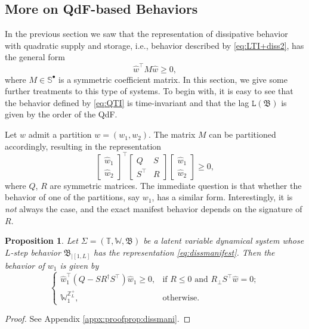\documentclass[11pt,print,draftcls,onecolumn,romanappendices]{ieeecolor}
\newtheorem{prop}[thm]{Proposition}
\newcommand{\W}{\mathbb{W}}
\newcommand{\T}{\mathbb{T}}
\newcommand{\Zp}[1]{\mathbb{Z}^+_{#1}}
\newcommand{\lag}[1]{\mathtt{L}\left(#1\right)}
\newcommand{\revise}[1]{{\color{black} #1}}
\newcommand{\B}{\mathfrak{B}}
\newcommand{\bint}[1]{{|[#1]}}
\begin{document}
\subsection{More on QdF-based Behaviors}
In the previous section we \revise{saw} that the representation of dissipative behavior with quadratic supply and storage, i.e., behavior described by \eqref{eq:LTI+diss2}, has the general form
\begin{equation}\label{eq:QTI}
	\hat{w}^\top M\hat{w}\geq0,
\end{equation}
where $M\in\mathbb{S}^\bullet$ is a symmetric coefficient matrix. In this section, we give some further treatments to this type of systems. To begin with, it is easy to see that the behavior defined by \eqref{eq:QTI} is time-invariant and that the lag $\lag{\B}$ is given by the order of the QdF.

\revise{Let $w$ admit a partition $w=(w_1,w_2)$. The matrix $M$ can be partitioned accordingly, resulting in the representation}
\begin{equation}\label{eq:dissmanifest}
	\begin{bmatrix}
		\hat{w}_1\\ \hat{w}_2
	\end{bmatrix}^\top \begin{bmatrix}
		Q&S\\S^\top &R
	\end{bmatrix}\begin{bmatrix}
		\hat{w}_1\\ \hat{w}_2
	\end{bmatrix}\geq0,
\end{equation}
where $Q$, $R$ are symmetric matrices. The immediate question is that whether the \revise{behavior of one of the partitions, say $w_1$,} has a similar form. Interestingly, it is \emph{not} always the case, and the exact manifest behavior depends on the signature of $R$.
\begin{prop}\label{prop:dissmani}
	Let $\Sigma=(\T,\W,\B)$ be a latent variable dynamical system whose $L$-step behavior $\B_\bint{1,L}$ has the representation \eqref{eq:dissmanifest}. Then the \revise{behavior of $w_1$} is given by
	\begin{equation}\label{eq:dissmani}
		\begin{cases}
			\hat{w}_1^\top \left(Q-SR^\dagger S^\top \right)\hat{w}_1\geq0, & \text{if } R\leq0 \text{ and } R_\perp S^\top \hat{w}=0;\\
			\W_1^{{\Zp{L}}}, & \text{otherwise}.
		\end{cases}
	\end{equation}
\end{prop}
\begin{proof}
	See Appendix \ref{appx:proofprop:dissmani}.
\end{proof}
\end{document}
